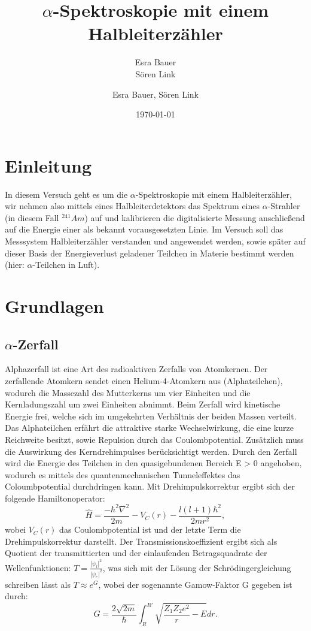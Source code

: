 \documentclass[bigchapter,colorback,accentcolor=tud4b,linedtoc,11pt]{tudreport}
\title{$\alpha$-Spektroskopie mit einem Halbleiterzähler}
\subtitle{Esra Bauer \\Sören Link}
\author{Esra Bauer, Sören Link}
\date{\today}
\begin{document}

\maketitle

\tableofcontents


\chapter{Einleitung}

In diesem Versuch geht es um die $\alpha$-Spektroskopie mit einem Halbleiterzähler, wir nehmen also mittels eines Halbleiterdetektors das Spektrum eines $\alpha$-Strahler (in diesem Fall $^{241}Am$) auf und kalibrieren die digitalisierte Messung anschließend auf die Energie einer als bekannt vorausgesetzten Linie. Im Versuch soll das Messsystem Halbleiterzähler verstanden und angewendet werden, sowie später auf dieser Basis der Energieverlust geladener Teilchen in Materie bestimmt werden (hier: $\alpha$-Teilchen in Luft).

\chapter{Grundlagen}

\section{$\alpha$-Zerfall}

Alphazerfall ist eine Art des radioaktiven Zerfalls von Atomkernen. Der zerfallende Atomkern sendet einen Helium-4-Atomkern aus (Alphateilchen), wodurch die Massezahl des Mutterkerns um vier Einheiten und die Kernladungszahl um zwei Einheiten abnimmt. Beim Zerfall wird kinetische Energie frei, welche sich im umgekehrten Verhältnis der beiden Massen verteilt. Das Alphateilchen erfährt die attraktive starke Wechselwirkung, die eine kurze Reichweite besitzt, sowie Repulsion durch das Coulombpotential. Zusätzlich muss die Auswirkung des Kerndrehimpulses berücksichtigt werden. Durch den Zerfall wird die Energie des Teilchen in den quasigebundenen Bereich E > 0 angehoben, wodurch es mittels des quantenmechanischen Tunneleffektes das Coloumbpotential durchdringen kann. Mit Drehimpulskorrektur ergibt sich der folgende Hamiltonoperator: 
$$\hat{H} = \frac{-\hbar^2 \nabla^2}{2 m} - V_C(r) - \frac{l(l+1) \hbar^2}{2 m r^2},$$
wobei $V_C(r)$ das Coulombpotential ist und der letzte Term die Drehimpulskorrektur darstellt.
Der Transmissionskoeffizient ergibt sich als Quotient der transmittierten und der einlaufenden Betragsquadrate der Wellenfunktionen: $T = \frac{|\psi_t|^2}{|\psi_e|^2}$, was sich mit der Lösung der Schrödingergleichung schreiben lässt als $T \approx e^G$, wobei der sogenannte Gamow-Faktor G gegeben ist durch:
$$G = \frac{2 \sqrt{2 m}}{\hbar}\int_R^{R'} \sqrt{\frac{Z_1Z_2e^2}{r}-E} dr.$$
\end{document}
